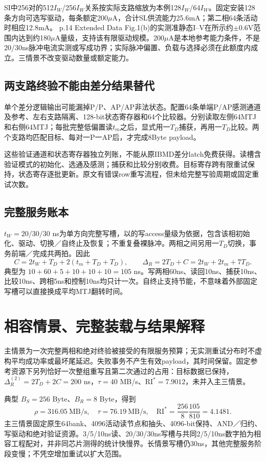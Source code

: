 SI中256对的512$I_W$/256$I_W$关系按实际支路缩放为本例128$I_W$/64$I_W$。固定安装128条方向可选写驱动，每条额定200$\mu$A，合计SL供流能力25.6mA；第二相64条活动时相应12.8mA。 p.14 Extended Data Fig.1(b)的实测准静态I--V在所示约$\pm0.6$V范围内达到约180$\mu$A量级，支持该有限驱动规模。200$\mu$A是本地参考能力条件，不是20/30ns脉冲电流实测或写成功界；实际脉冲偏置、负载与选择必须在此额度内成立。三情景不改变驱动数量或额定能力。

\subsection{两支路终验不能由差分结果替代}
单个差分逻辑输出可能漏掉P/P、AP/AP非法状态。配置64条单端P/AP感测通道及参考、左右支路隔离、128-bit状态寄存器和64个比较器。分别读取左侧64MTJ和右侧64MTJ；每批完整低偏置读$t_m$之后，显式用一$T_D$捕获，再用一$T_D$比较。两个支路均匹配目标、每对一P一AP后，才完成8Byte payload。

这些验证通道和状态寄存器独立列账，不能从原IBMD差分latch免费获得。读槽含验证模式的初始化、选通及感测；捕获和比较分别收费。目标寄存跨有限重试保持，状态寄存逐批更新。原文有错误row重写流程，但未给完整写验周期或固定重试次数。

\subsection{完整服务账本}
$t_W=20/30/30$ ns为单方向完整写槽，以的写access量级为依据，包含该相初始化、驱动、切换／自终止及恢复；不重复叠裸脉冲。两相之间另用一$T_D$切换，事务前端／完成共两拍。因此
\[
C=2t_W+T_D+2(t_m+T_D+T_D),\qquad
\boxed{\Delta_R=2T_D+C=2t_W+2t_m+7T_D.}
\]
典型为 $10+60+5+10+10+10=105$ ns。写两相60ns、读回10ns、捕获10ns、比较10ns、跨相5ns和控制10ns均只计一次。自终止支持节能，不意味着外部固定写槽可以直接换成平均MTJ翻转时间。

\clearpage
\section{相容情景、完整装载与结果解释}



主情景为一次完整两相和绝对终验被接受的有限服务预算；无实测重试分布时不虚构平均成功率或最坏尾延迟。失败事务不产生有效payload，其时间保留。固定参考资源下另列恰好一次整组重写且第二次通过的占用：目标数据已保持，$\Delta_R^{(2)}=2T_D+2C=200$ ns，$\tau=40$ MB/s、$\mathrm{RI}^*=7.9012$，未并入主三情景。

典型 $B_S=256$ Byte、$B_R=8$ Byte，得到
\[
\rho=316.05\ \mathrm{MB/s},\quad\tau=76.19\ \mathrm{MB/s},\quad
\mathrm{RI}^*=\frac{256}{8}\frac{105}{810}=4.1481.
\]
主三情景固定原生64bank、4096活动读节点和抽头、4096-bit保持、AND／归约、写驱动和绝对验证资源。3/5/10ns读、20/30/30ns写槽与共同2/5/10ns数字拍为相容工程配对，并非同芯片测得的统计快慢界。长情景写槽仍30ns，其他完整服务阶段变慢；不凭空增加重试以扩大范围。

